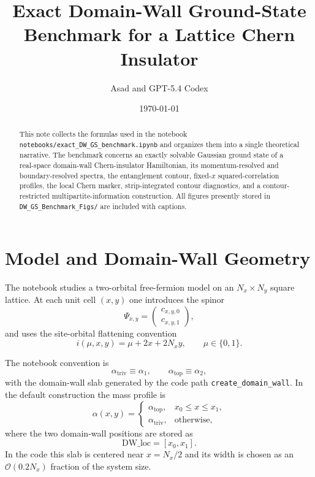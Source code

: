 \documentclass[aps,prb,onecolumn,nofootinbib]{revtex4-2}
\newcommand{\triv}{\mathrm{triv}}
\newcommand{\topo}{\mathrm{top}}
\begin{document}
\title{Exact Domain-Wall Ground-State Benchmark for a Lattice Chern Insulator}
\author{Asad and GPT-5.4 Codex}
\date{\today}

\begin{abstract}
This note collects the formulas used in the notebook
\texttt{notebooks/exact\_DW\_GS\_benchmark.ipynb} and organizes them into a
single theoretical narrative.  The benchmark concerns an exactly solvable
Gaussian ground state of a real-space domain-wall Chern-insulator Hamiltonian,
its momentum-resolved and boundary-resolved spectra, the entanglement contour,
fixed-$x$ squared-correlation profiles, the local Chern marker,
strip-integrated contour diagnostics, and a
contour-restricted multipartite-information construction.  All figures presently
stored in \texttt{DW\_GS\_Benchmark\_Figs/} are included with captions.
\end{abstract}

\maketitle

\section{Model and Domain-Wall Geometry}
The notebook studies a two-orbital free-fermion model on an
$N_x \times N_y$ square lattice.  At each unit cell $(x,y)$ one introduces the
spinor
\begin{equation}
\Psi_{x,y}
=
\begin{pmatrix}
c_{x,y,0} \\
c_{x,y,1}
\end{pmatrix},
\end{equation}
and uses the site-orbital flattening convention
\begin{equation}
i(\mu,x,y) = \mu + 2x + 2N_x y,
\qquad
\mu \in \{0,1\}.
\end{equation}

The notebook convention is
\begin{equation}
\alpha_{\triv} \equiv \alpha_1,
\qquad
\alpha_{\topo} \equiv \alpha_2,
\end{equation}
with the domain-wall slab generated by the code path
\texttt{create\_domain\_wall}.  In the default construction the mass profile is
\begin{equation}
\alpha(x,y) =
\begin{cases}
\alpha_{\topo}, & x_0 \le x \le x_1,\\
\alpha_{\triv}, & \text{otherwise},
\end{cases}
\label{eq:alpha-profile}
\end{equation}
where the two domain-wall positions are stored as
\begin{equation}
\mathrm{DW\_loc} = [x_0, x_1].
\end{equation}
In the code this slab is centered near $x=N_x/2$ and its width is chosen as an
$\mathcal{O}(0.2N_x)$ fraction of the system size.
\end{document}
